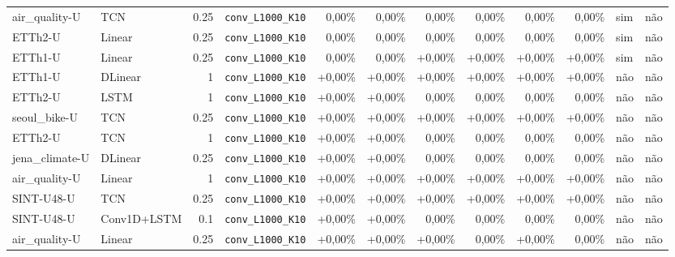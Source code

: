 \begin{longtable}{llrlrrrrrrll}
air\_quality-U & TCN & 0.25 & \texttt{conv\_\allowbreak{}L1000\_\allowbreak{}K10} & \textminus{}0,00\% & \textminus{}0,00\% & \textminus{}0,00\% & \textminus{}0,00\% & \textminus{}0,00\% & \textminus{}0,00\% & sim & n\~ao \\
ETTh2-U & Linear & 0.25 & \texttt{conv\_\allowbreak{}L1000\_\allowbreak{}K10} & \textminus{}0,00\% & \textminus{}0,00\% & \textminus{}0,00\% & \textminus{}0,00\% & \textminus{}0,00\% & \textminus{}0,00\% & sim & n\~ao \\
ETTh1-U & Linear & 0.25 & \texttt{conv\_\allowbreak{}L1000\_\allowbreak{}K10} & \textminus{}0,00\% & \textminus{}0,00\% & +0,00\% & +0,00\% & +0,00\% & +0,00\% & sim & n\~ao \\
ETTh1-U & DLinear & 1 & \texttt{conv\_\allowbreak{}L1000\_\allowbreak{}K10} & +0,00\% & +0,00\% & +0,00\% & +0,00\% & +0,00\% & +0,00\% & n\~ao & n\~ao \\
ETTh2-U & LSTM & 1 & \texttt{conv\_\allowbreak{}L1000\_\allowbreak{}K10} & +0,00\% & +0,00\% & \textminus{}0,00\% & \textminus{}0,00\% & \textminus{}0,00\% & \textminus{}0,00\% & n\~ao & n\~ao \\
seoul\_bike-U & TCN & 0.25 & \texttt{conv\_\allowbreak{}L1000\_\allowbreak{}K10} & +0,00\% & +0,00\% & +0,00\% & +0,00\% & +0,00\% & +0,00\% & n\~ao & n\~ao \\
ETTh2-U & TCN & 1 & \texttt{conv\_\allowbreak{}L1000\_\allowbreak{}K10} & +0,00\% & +0,00\% & \textminus{}0,00\% & \textminus{}0,00\% & \textminus{}0,00\% & \textminus{}0,00\% & n\~ao & n\~ao \\
jena\_climate-U & DLinear & 0.25 & \texttt{conv\_\allowbreak{}L1000\_\allowbreak{}K10} & +0,00\% & +0,00\% & \textminus{}0,00\% & \textminus{}0,00\% & \textminus{}0,00\% & \textminus{}0,00\% & n\~ao & n\~ao \\
air\_quality-U & Linear & 1 & \texttt{conv\_\allowbreak{}L1000\_\allowbreak{}K10} & +0,00\% & +0,00\% & +0,00\% & +0,00\% & +0,00\% & +0,00\% & n\~ao & n\~ao \\
SINT-U48-U & TCN & 0.25 & \texttt{conv\_\allowbreak{}L1000\_\allowbreak{}K10} & +0,00\% & +0,00\% & +0,00\% & +0,00\% & +0,00\% & +0,00\% & n\~ao & n\~ao \\
SINT-U48-U & Conv1D+LSTM & 0.1 & \texttt{conv\_\allowbreak{}L1000\_\allowbreak{}K10} & +0,00\% & +0,00\% & \textminus{}0,00\% & \textminus{}0,00\% & \textminus{}0,00\% & \textminus{}0,00\% & n\~ao & n\~ao \\
air\_quality-U & Linear & 0.25 & \texttt{conv\_\allowbreak{}L1000\_\allowbreak{}K10} & +0,00\% & +0,00\% & +0,00\% & \textminus{}0,00\% & +0,00\% & \textminus{}0,00\% & n\~ao & n\~ao \\

\end{longtable}
